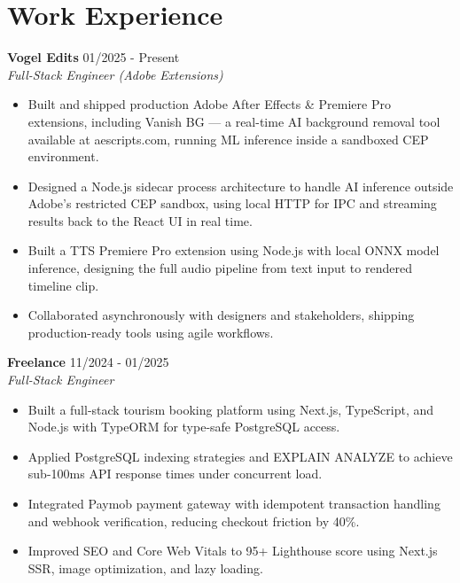 \documentclass[11pt]{article}
\begin{document}
\section{Work Experience}
\textbf{Vogel Edits} \hfill 01/2025 - Present \\
\textit{Full-Stack Engineer (Adobe Extensions)}\\\begin{itemize}
\item Built and shipped production Adobe After Effects \& Premiere Pro extensions, including Vanish BG — a real-time AI background removal tool available at aescripts.com, running ML inference inside a sandboxed CEP environment.
\item Designed a Node.js sidecar process architecture to handle AI inference outside Adobe's restricted CEP sandbox, using local HTTP for IPC and streaming results back to the React UI in real time.
\item Built a TTS Premiere Pro extension using Node.js with local ONNX model inference, designing the full audio pipeline from text input to rendered timeline clip.
\item Collaborated asynchronously with designers and stakeholders, shipping production-ready tools using agile workflows.
\end{itemize}

\textbf{Freelance} \hfill 11/2024 - 01/2025 \\
\textit{Full-Stack Engineer}\\\begin{itemize}
\item Built a full-stack tourism booking platform using Next.js, TypeScript, and Node.js with TypeORM for type-safe PostgreSQL access.
\item Applied PostgreSQL indexing strategies and EXPLAIN ANALYZE to achieve sub-100ms API response times under concurrent load.
\item Integrated Paymob payment gateway with idempotent transaction handling and webhook verification, reducing checkout friction by 40\%.
\item Improved SEO and Core Web Vitals to 95+ Lighthouse score using Next.js SSR, image optimization, and lazy loading.
\end{itemize}
\end{document}
